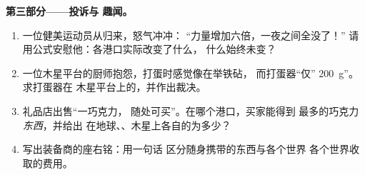 \begin{problem}
\medskip\noindent\textbf{第三部分——投诉与
趣闻。}
\begin{enumerate}[resume]
  \item 一位健美运动员从归来，怒气冲冲：
        “力量增加六倍，一夜之间全没了！”
        请用公式安慰他：各港口实际改变了什么，
        什么始终未变？
  \item 一位木星平台的厨师抱怨，打蛋时感觉像在举铁砧，
        而打蛋器“仅”
        \qty{200}{g}”。求打蛋器在
        木星平台上的，并作出裁决。
  \item 礼品店出售“一巧克力，
        随处可买”。在哪个港口，买家能得到
        最多的巧克力\emph{东西}，并给出
        在地球、、木星上各自的为多少？
  \item 写出装备商的座右铭：用一句话
        区分随身携带的东西与各个世界
        各个世界收取的费用。
\end{enumerate}
\end{problem}
